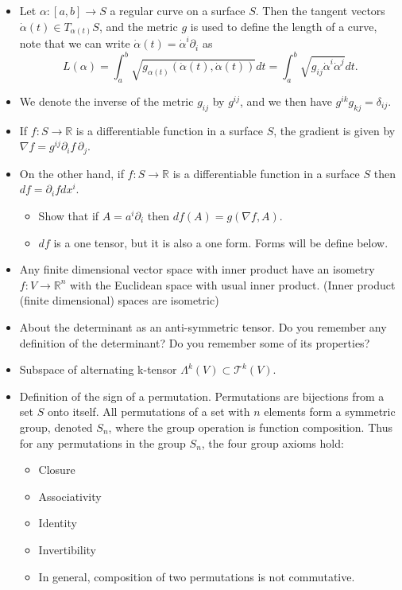\documentclass{amsart}
\begin{document}
\begin{itemize}
\item Let \(\alpha: [a,b] \to S\) a regular curve on a surface \(S\). Then the tangent vectors \(\dot{\alpha}(t) \in T_{\alpha(t)}S\), and the metric \(g\) is used to define the length of a curve, note that we can write \(\dot{\alpha}(t) = \dot{\alpha}^i\partial_i\) as \[ L(\alpha) = \int_{a}^{b} \sqrt{g_{\alpha(t)}(\dot{\alpha}(t),\dot{\alpha}(t))} dt = \int_{a}^{b} \sqrt{g_{ij}\dot{\alpha}^i\dot{\alpha}^j} dt. \]
\item We denote the inverse of the metric \(g_{ij}\) by \(g^{ij}\), and we then have \(g^{ik}g_{kj} = \delta_{ij}\).
\item If \(f:S\to \mathbb{R}\) is a differentiable function in a surface \(S\), the gradient is given by \(\nabla f = g^{ij}\partial_if \, \partial_j\).
\item On the other hand, if \(f:S\to \mathbb{R}\) is a differentiable function in a surface \(S\) then \(df = \partial_i f dx^{i}\).
\begin{itemize}
\item Show that if \(A = a^i\partial_i\) then \(df(A) = g( \nabla f, A)\).
\item \(df\) is a one tensor, but it is also a one form. Forms will be define below.
\end{itemize}
\item Any finite dimensional vector space with inner product have an isometry \(f:V\to \mathbb{R}^n\) with the Euclidean space with usual inner product. (Inner product (finite dimensional) spaces are isometric)
\item About the determinant as an anti-symmetric tensor. Do you remember any definition of the determinant? Do you remember some of its properties?
\item Subspace of alternating k-tensor \(\Lambda^k(V) \subset \mathcal{T}^k(V)\).
\item Definition of the sign of a permutation. Permutations are bijections from a set \(S\) onto itself. All permutations of a set with \(n\) elements form a symmetric group, denoted \(S_n\), where the group operation is function composition. Thus for any permutations in the group \(S_{n}\), the four group axioms hold:
\begin{itemize}
\item Closure
\item Associativity
\item Identity
\item Invertibility
\item In general, composition of two permutations is not commutative.

\end{itemize}
\end{itemize}
\end{document}
